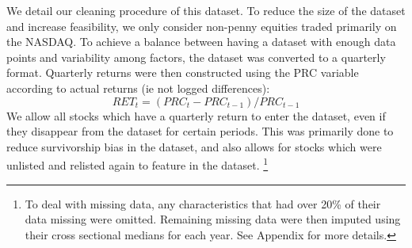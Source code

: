\documentclass{article}
\begin{document}


We detail our cleaning procedure of this dataset. To reduce the size of the dataset and increase feasibility, we only consider non-penny equities traded primarily on the NASDAQ. To achieve a balance between having a dataset with enough data points and variability among factors, the dataset was converted to a quarterly format. Quarterly returns were then constructed using the PRC variable according to actual returns (ie not logged differences):
\begin{equation}
RET_t = (PRC_t - PRC_{t-1})/PRC_{t-1}
\end{equation}
We allow all stocks which have a quarterly return to enter the dataset, even if they disappear from the dataset for certain periods. This was primarily done to reduce survivorship bias in the dataset, and also allows for stocks which were unlisted and relisted again to feature in the dataset. \footnote{To deal with missing data, any characteristics that had over 20\% of their data missing were omitted. Remaining missing data were then imputed using their cross sectional medians for each year. See Appendix for more details.}



\end{document}
